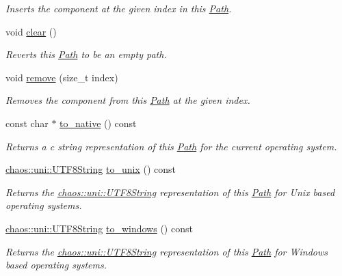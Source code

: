 \begin{DoxyCompactItemize}
\begin{DoxyCompactList}\small\item\em Inserts the component at the given index in this \hyperlink{classchaos_1_1io_1_1sys_1_1_path}{Path}. \end{DoxyCompactList}\item 
void \hyperlink{classchaos_1_1io_1_1sys_1_1_path_a7c4cd7e5d8e21a8c522f8a87f1e90f4c}{clear} ()
\begin{DoxyCompactList}\small\item\em Reverts this \hyperlink{classchaos_1_1io_1_1sys_1_1_path}{Path} to be an empty path. \end{DoxyCompactList}\item 
void \hyperlink{classchaos_1_1io_1_1sys_1_1_path_aefc69b11820209acca278104fb230832}{remove} (size\+\_\+t index)
\begin{DoxyCompactList}\small\item\em Removes the component from this \hyperlink{classchaos_1_1io_1_1sys_1_1_path}{Path} at the given index. \end{DoxyCompactList}\item 
const char $\ast$ \hyperlink{classchaos_1_1io_1_1sys_1_1_path_a9528370d2e3ab277a7e71a93469bbc45}{to\+\_\+native} () const 
\begin{DoxyCompactList}\small\item\em Returns a c string representation of this \hyperlink{classchaos_1_1io_1_1sys_1_1_path}{Path} for the current operating system. \end{DoxyCompactList}\item 
\hyperlink{classchaos_1_1uni_1_1_u_t_f8_string}{chaos\+::uni\+::\+U\+T\+F8\+String} \hyperlink{classchaos_1_1io_1_1sys_1_1_path_a1cfe95a7a81ba7da856ae79917e6b1bf}{to\+\_\+unix} () const 
\begin{DoxyCompactList}\small\item\em Returns the \hyperlink{classchaos_1_1uni_1_1_u_t_f8_string}{chaos\+::uni\+::\+U\+T\+F8\+String} representation of this \hyperlink{classchaos_1_1io_1_1sys_1_1_path}{Path} for Unix based operating systems. \end{DoxyCompactList}\item 
\hyperlink{classchaos_1_1uni_1_1_u_t_f8_string}{chaos\+::uni\+::\+U\+T\+F8\+String} \hyperlink{classchaos_1_1io_1_1sys_1_1_path_ad7b185968a88741d52526a32738d0ab4}{to\+\_\+windows} () const 
\begin{DoxyCompactList}\small\item\em Returns the \hyperlink{classchaos_1_1uni_1_1_u_t_f8_string}{chaos\+::uni\+::\+U\+T\+F8\+String} representation of this \hyperlink{classchaos_1_1io_1_1sys_1_1_path}{Path} for Windows based operating systems. \end{DoxyCompactList}\item 

\end{DoxyCompactItemize}
